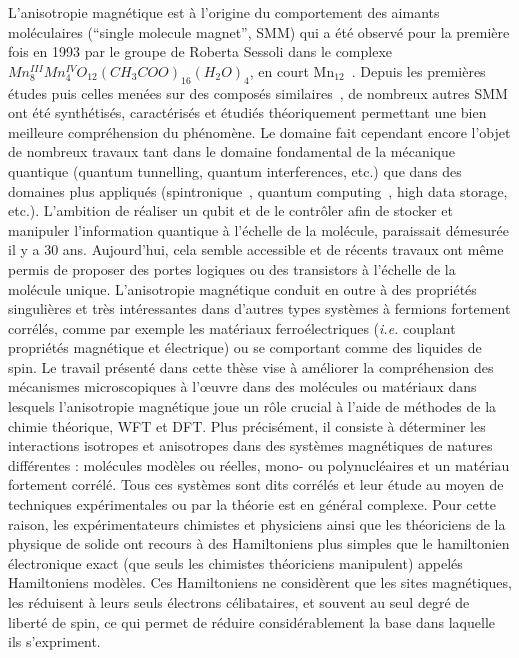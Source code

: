 \documentclass[12pt,a4paper]{report}
\numberwithin{equation}{section}
\begin{document}
L’anisotropie magnétique est à l’origine du comportement des aimants moléculaires (``single molecule magnet'', SMM) qui a été observé pour la première fois en 1993 par le groupe de Roberta Sessoli dans le complexe $Mn^{III}_8 Mn^{IV}_4 O_{12}(CH_3COO)_{16}(H_2O)_4$, en court Mn$_{12}$~\cite{sessoli_high-spin_1993}.
Depuis les premières études puis celles menées sur des composés similaires~\cite{burgess_magnetic_2015}, de nombreux autres SMM ont été synthétisés, caractérisés et étudiés théoriquement permettant une bien meilleure compréhension du phénomène. Le domaine fait cependant encore l'objet de nombreux travaux tant dans le domaine fondamental de la mécanique quantique (quantum tunnelling, quantum interferences, etc.) que dans des domaines plus appliqués (spintronique~\cite{sanvito_molecular_2011}, quantum computing~\cite{leuenberger_quantum_2001}, high data storage, etc.).
L’ambition de réaliser un qubit et de le contrôler afin de stocker et manipuler l’information quantique à l’échelle de la molécule, paraissait démesurée il y a 30 ans.
Aujourd’hui, cela semble accessible et de récents travaux ont même permis de proposer des portes logiques ou des transistors à l’échelle de la molécule unique.
L’anisotropie magnétique conduit en outre à des propriétés singulières et très intéressantes dans d'autres types systèmes à fermions fortement corrélés, comme par exemple les matériaux ferroélectriques (\textit{i.e.} couplant propriétés magnétique et électrique) ou se comportant comme des liquides de spin. 
Le travail présenté dans cette thèse vise à améliorer la compréhension des mécanismes microscopiques à l'\oe uvre dans des molécules ou matériaux dans lesquels l'anisotropie magnétique joue un rôle crucial à l'aide de méthodes de la chimie théorique, WFT et DFT.
Plus précisément, il consiste à déterminer les interactions isotropes et anisotropes dans des systèmes magnétiques de natures différentes : molécules modèles ou réelles, mono- ou polynucléaires et un matériau fortement corrélé. 
Tous ces systèmes sont dits corrélés et leur étude au moyen de techniques expérimentales ou par la théorie est en général complexe. 
Pour cette raison, les expérimentateurs chimistes et physiciens ainsi que les théoriciens de la physique de solide ont recours à des Hamiltoniens plus simples que le hamiltonien électronique exact (que seuls les chimistes théoriciens manipulent) appelés Hamiltoniens modèles. 
Ces Hamiltoniens ne considèrent que les sites magnétiques, les réduisent à leurs seuls électrons célibataires, et souvent au seul degré de liberté de spin, ce qui permet de réduire considérablement la base dans laquelle ils s’expriment. 
\end{document}
